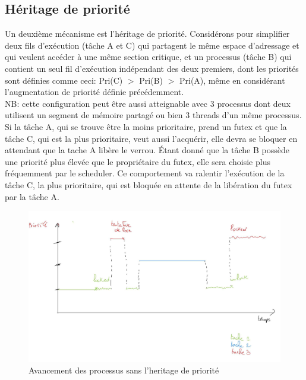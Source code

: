 \subsection{Héritage de priorité}

Un deuxième mécanisme est l'héritage de priorité. 
Considérons pour simplifier deux fils d'exécution
(tâche A et C) qui partagent le même espace d'adressage et qui veulent accéder 
à une même section critique, et un processus (tâche B) qui contient 
un seul fil d'exécution indépendant des deux 
premiers, dont les priorités sont définies comme ceci: Pri(C) $>$ Pri(B) $>$ 
Pri(A), même en considérant l'augmentation de priorité définie précédemment.
\\

NB: cette configuration peut être aussi atteignable avec 3 processus dont deux 
utilisent un segment de mémoire partagé ou bien 3 threads d'un même processus.
\\

Si la tâche A, qui se trouve être la moins prioritaire, prend un futex et que 
la tâche C, qui est la plus prioritaire, veut aussi l'acquérir, elle
devra se bloquer en attendant que la tache A libère le verrou. Étant donné que 
la tâche B possède une priorité plus élevée que le propriétaire du futex, elle 
sera choisie plus fréquemment par le scheduler. Ce comportement va ralentir 
l'exécution de la tâche C, la plus prioritaire, qui est bloquée en attente de la 
libération du futex par la tâche A.

\begin{figure}[h!]
	\centering
	\includegraphics[scale=0.15]{include/without_inherit.jpg}
	\caption{Avancement des processus sans l'heritage de priorité}
	\label{fig:without_inherit}
\end{figure}

